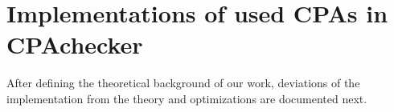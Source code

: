 \chapter{Implementations of used CPAs in CPAchecker}
After defining the theoretical background of our work, deviations of the implementation from the theory and optimizations are documented next.



